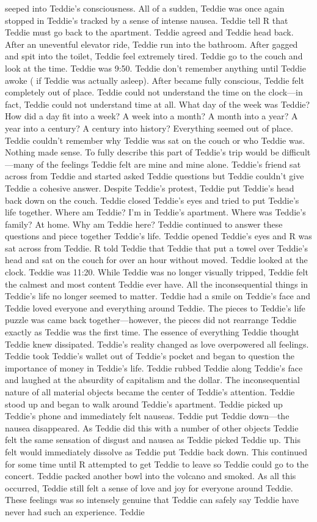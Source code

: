 \documentclass[12pt]{book}
\begin{document}
seeped into Teddie's consciousness. All of a sudden, Teddie was once again stopped in Teddie's tracked by a sense of intense nausea. Teddie tell R that Teddie must go back to the apartment. Teddie agreed and Teddie head back. After an uneventful elevator ride, Teddie run into the bathroom. After gagged and spit into the toilet, Teddie feel extremely tired. Teddie go to the couch and look at the time. Teddie was 9:50. Teddie don't remember anything until Teddie awoke ( if Teddie was actually asleep). After became fully conscious, Teddie felt completely out of place. Teddie could not understand the time on the clock---in fact, Teddie could not understand time at all. What day of the week was Teddie? How did a day fit into a week? A week into a month? A month into a year? A year into a century? A century into history? Everything seemed out of place. Teddie couldn't remember why Teddie was sat on the couch or who Teddie was. Nothing made sense. To fully describe this part of Teddie's trip would be difficult---many of the feelings Teddie felt are mine and mine alone. Teddie's friend sat across from Teddie and started asked Teddie questions but Teddie couldn't give Teddie a cohesive answer. Despite Teddie's protest, Teddie put Teddie's head back down on the couch. Teddie closed Teddie's eyes and tried to put Teddie's life together. Where am Teddie? I'm in Teddie's apartment. Where was Teddie's family? At home. Why am Teddie here? Teddie continued to answer these questions and piece together Teddie's life. Teddie opened Teddie's eyes and R was sat across from Teddie. R told Teddie that Teddie that put a towel over Teddie's head and sat on the couch for over an hour without moved. Teddie looked at the clock. Teddie was 11:20. While Teddie was no longer visually tripped, Teddie felt the calmest and most content Teddie ever have. All the inconsequential things in Teddie's life no longer seemed to matter. Teddie had a smile on Teddie's face and Teddie loved everyone and everything around Teddie. The pieces to Teddie's life puzzle was came back together---however, the pieces did not rearrange Teddie exactly as Teddie was the first time. The essence of everything Teddie thought Teddie knew dissipated. Teddie's reality changed as love overpowered all feelings. Teddie took Teddie's wallet out of Teddie's pocket and began to question the importance of money in Teddie's life. Teddie rubbed Teddie along Teddie's face and laughed at the absurdity of capitalism and the dollar. The inconsequential nature of all material objects became the center of Teddie's attention. Teddie stood up and began to walk around Teddie's apartment. Teddie picked up Teddie's phone and immediately felt nauseas. Teddie put Teddie down---the nausea disappeared. As Teddie did this with a number of other objects Teddie felt the same sensation of disgust and nausea as Teddie picked Teddie up. This felt would immediately dissolve as Teddie put Teddie back down. This continued for some time until R attempted to get Teddie to leave so Teddie could go to the concert. Teddie packed another bowl into the volcano and smoked. As all this occurred, Teddie still felt a sense of love and joy for everyone around Teddie. These feelings was so intensely genuine that Teddie can safely say Teddie have never had such an experience. Teddie 
\end{document}
